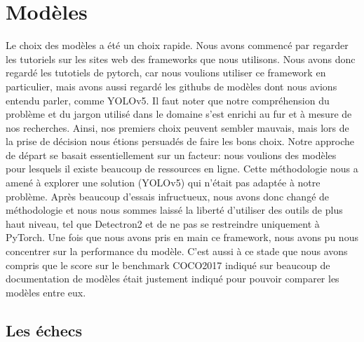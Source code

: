 \chapter{Modèles}
\label{chap:Modeles}

Le choix des modèles a été un choix rapide.\newline
Nous avons commencé par regarder les tutoriels sur les sites web des frameworks que nous utilisons. Nous avons donc regardé les tutotiels de pytorch, car nous voulions utiliser ce framework en particulier, mais avons aussi regardé les githubs de modèles dont nous avions entendu parler, comme YOLOv5. Il faut noter que notre compréhension du problème et du jargon utilisé dans le domaine s’est enrichi au fur et à mesure de nos recherches. \newline 
Ainsi, nos premiers choix peuvent sembler mauvais, mais lors de la prise de décision nous étions persuadés de faire les bons choix. Notre approche de départ se basait essentiellement sur un facteur: nous voulions des modèles pour lesquels il existe beaucoup de ressources en ligne. Cette méthodologie nous a amené à explorer une solution (YOLOv5) qui n’était pas adaptée à notre problème. \newline
Après beaucoup d’essais infructueux, nous avons donc changé de méthodologie et nous nous sommes laissé la liberté d’utiliser des outils de plus haut niveau, tel que Detectron2 et de ne pas se restreindre uniquement à PyTorch. Une fois que nous avons pris en main ce framework, nous avons pu nous concentrer sur la performance du modèle. C'est aussi à ce stade que nous avons compris que le score sur le benchmark COCO2017 indiqué sur beaucoup de documentation de modèles était justement indiqué pour pouvoir comparer les modèles entre eux.

\section{Les échecs}
